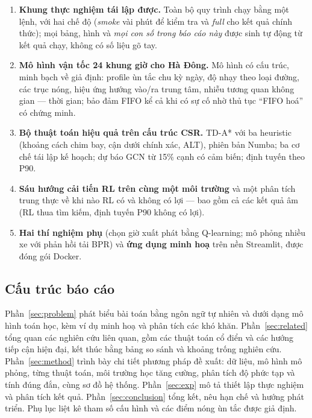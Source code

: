 \begin{enumerate}[label=(\arabic*)]
    \item \textbf{Khung thực nghiệm tái lập được.} Toàn bộ quy trình chạy bằng một lệnh, với hai chế độ (\emph{smoke}
    vài phút để kiểm tra và \emph{full} cho kết quả chính thức); mọi bảng, hình và \emph{mọi con số trong báo cáo này}
    được sinh tự động từ kết quả chạy, không có số liệu gõ tay.
    \item \textbf{Mô hình vận tốc 24 khung giờ cho Hà Đông.} Mô hình có cấu trúc, minh bạch về giả định: profile ùn tắc
    chu kỳ ngày, độ nhạy theo loại đường, các trục nóng, hiệu ứng hướng vào/ra trung tâm, nhiễu tương quan không gian ---
    thời gian; bảo đảm FIFO kể cả khi có sự cố nhờ thủ tục ``FIFO hoá'' có chứng minh.
    \item \textbf{Bộ thuật toán hiệu quả trên cấu trúc CSR.} TD-A* với ba heuristic (khoảng cách chim bay, cận dưới chính
    xác, ALT), phiên bản Numba; ba cơ chế tái lập kế hoạch; dự báo GCN từ 15\% cạnh có cảm biến; định tuyến theo P90.
    \item \textbf{Sáu hướng cải tiến RL trên cùng một môi trường} và một phân tích trung thực về khi nào RL có và không
    có lợi --- bao gồm cả các kết quả âm (RL thua tìm kiếm, định tuyến P90 không có lợi).
    \item \textbf{Hai thí nghiệm phụ} (chọn giờ xuất phát bằng Q-learning; mô phỏng nhiều xe với phản hồi tải BPR) và
    \textbf{ứng dụng minh hoạ} trên nền Streamlit, được đóng gói Docker.
\end{enumerate}

\subsection{Cấu trúc báo cáo}\label{sec:intro:outline}

Phần~\ref{sec:problem} phát biểu bài toán bằng ngôn ngữ tự nhiên và dưới dạng mô hình toán học, kèm ví dụ minh hoạ
và phân tích các khó khăn. Phần~\ref{sec:related} tổng quan các nghiên cứu liên quan, gồm các thuật toán cổ điển và
các hướng tiếp cận hiện đại, kết thúc bằng bảng so sánh và khoảng trống nghiên cứu. Phần~\ref{sec:method} trình bày
chi tiết phương pháp đề xuất: dữ liệu, mô hình mô phỏng, từng thuật toán, môi trường học tăng cường, phân tích độ phức
tạp và tính đúng đắn, cùng sơ đồ hệ thống. Phần~\ref{sec:exp} mô tả thiết lập thực nghiệm và phân tích kết quả.
Phần~\ref{sec:conclusion} tổng kết, nêu hạn chế và hướng phát triển. Phụ lục liệt kê tham số cấu hình và các điểm nóng
ùn tắc được giả định.
